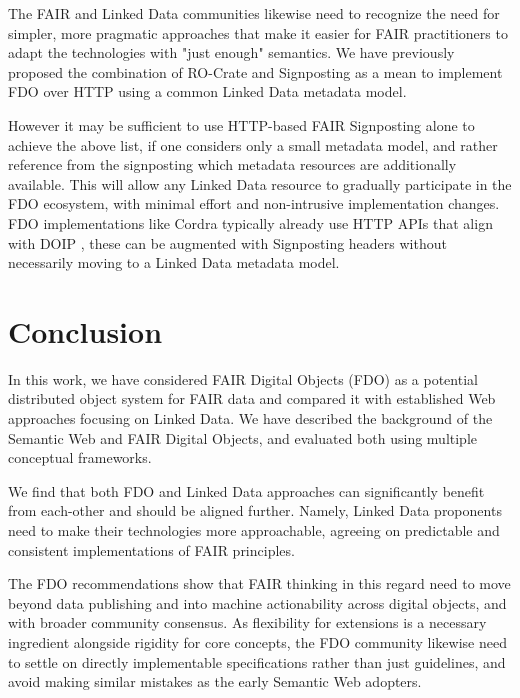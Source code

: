 \documentclass[fleqn,10pt,NOlineno]{wlpeerjlua}
\begin{document}
The FAIR and Linked Data communities likewise need to recognize the need for simpler, more pragmatic approaches that make it easier for FAIR practitioners to adapt the technologies with "just enough" semantics. 
We have previously proposed the combination of RO-Crate \autocite{10.3233/ds-210053} and Signposting \autocite{vandesompelFAIRSignpostingProfile2022} as a mean to implement FDO \autocite{10.3897/rio.8.e93937} over HTTP using a common Linked Data metadata model. 

However it may be sufficient to use HTTP-based FAIR Signposting alone to achieve the above list, if one considers only a small metadata model, and rather reference from the signposting which metadata resources are additionally available. 
This will allow any Linked Data resource to gradually participate in the FDO ecosystem, with minimal effort and non-intrusive implementation changes. FDO implementations like Cordra typically already use HTTP APIs that align with DOIP \autocite{DOIPAPIHTTPa}, these can be augmented with Signposting headers without necessarily moving to a Linked Data metadata model. 


\hypertarget{conclusion}{%
\section*{Conclusion}\label{conclusion}}

In this work, we have considered FAIR Digital Objects (FDO) as a potential distributed object system for FAIR data and compared it with established Web approaches focusing on Linked Data. We have described the background of the Semantic Web and FAIR Digital Objects, and evaluated both using multiple conceptual frameworks.

We find that both FDO and Linked Data approaches can significantly benefit from each-other and should be aligned further. Namely, Linked Data proponents need to make their technologies more approachable, agreeing on predictable and consistent implementations of FAIR principles. 

The FDO recommendations show that FAIR thinking in this regard need to move beyond data publishing and into machine actionability across digital objects, and with broader community consensus. 
As flexibility for extensions is a necessary ingredient alongside rigidity for core concepts, the FDO community likewise need to settle on directly implementable specifications rather than just guidelines, and avoid making similar mistakes as the early Semantic Web adopters. 
\end{document}
